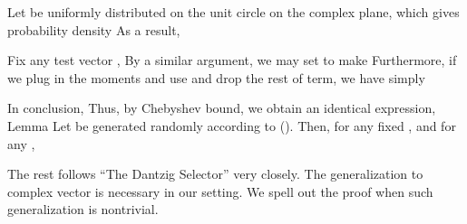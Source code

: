 \stopsection

\startsection [title={Design of \m {\M{F}_R}}]

Let  be uniformly distributed on the unit circle on the complex plane, which gives probability density
As a result,

Fix any test vector , 
By a similar argument, we may set
to make
Furthermore, if we plug in the moments and use  and drop the rest of  term, we have simply

In conclusion,
Thus, by Chebyshev bound, we obtain an identical expression,
\Result
{Lemma}
{
Let  be generated randomly according to ().
Then, for any fixed , and for any ,
}




\stopsection

\startsection [title={Mean Square Error Analysis for Complex DS}]

The rest follows ``The Dantzig Selector'' very closely.
The generalization to complex vector is necessary in our setting.
We spell out the proof when such generalization is nontrivial.

